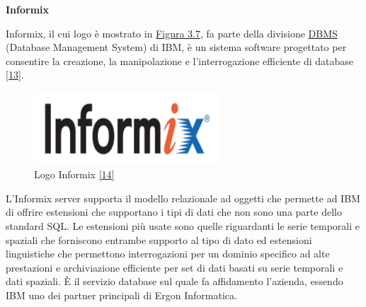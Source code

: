 \textbf{Informix}

Informix, il cui logo è mostrato in \hyperref[ibm]{Figura 3.7}, fa parte della divisione \hyperref[DBMS]{DBMS\glo} (Database Management System) di IBM, è un sistema software progettato per consentire la creazione,
la manipolazione e l'interrogazione efficiente di database \hyperref[informix]{[13]}.

\begin{figure}[H]
	\includegraphics[width=7cm]{immagini/Informix.png}
	\centering
	\caption{Logo Informix \hyperref[ilogo]{[14]}}
	\label{ibm}
\end{figure}


L'Informix server supporta il modello relazionale ad oggetti che permette ad IBM di offrire estensioni che supportano i tipi di dati che non sono una parte dello standard SQL.
Le estensioni più usate sono quelle riguardanti le serie temporali e spaziali che forniscono entrambe supporto al tipo di dato ed estensioni linguistiche che permettono 
interrogazioni per un dominio specifico ad alte prestazioni e archiviazione efficiente per set di dati basati su serie temporali e dati spaziali.
È il servizio database sul quale fa affidamento l'azienda, essendo IBM uno dei partner principali di Ergon Informatica.